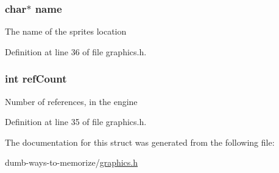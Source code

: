 \subsubsection[{\texorpdfstring{name}{name}}]{\setlength{\rightskip}{0pt plus 5cm}char$\ast$ name}\hypertarget{structsprite__s_a5ac083a645d964373f022d03df4849c8}{}\label{structsprite__s_a5ac083a645d964373f022d03df4849c8}
The name of the sprite\textquotesingle{}s location 

Definition at line 36 of file graphics.\+h.

\subsubsection[{\texorpdfstring{ref\+Count}{refCount}}]{\setlength{\rightskip}{0pt plus 5cm}int ref\+Count}\hypertarget{structsprite__s_a43ab0d8eafd71383b2233bdee65911de}{}\label{structsprite__s_a43ab0d8eafd71383b2233bdee65911de}
Number of references, in the engine 

Definition at line 35 of file graphics.\+h.



The documentation for this struct was generated from the following file\+:\begin{DoxyCompactItemize}
\item 
dumb-\/ways-\/to-\/memorize/\hyperlink{graphics_8h}{graphics.\+h}\end{DoxyCompactItemize}
